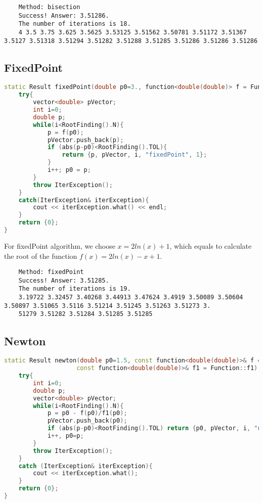 \documentclass{article}
\begin{document}
\begin{lstlisting}
    Method: bisection
    Success! Answer: 3.51286.
    The number of iterations is 18.
    4 3.5 3.75 3.625 3.5625 3.53125 3.51562 3.50781 3.51172 3.51367 3.5127 3.51318 3.51294 3.51282 3.51288 3.51285 3.51286 3.51286 3.51286
\end{lstlisting}



\subsection{FixedPoint}

\begin{lstlisting}[language=c++]
static Result fixedPoint(double p0=3., function<double(double)> f = Function::f){
    try{
        vector<double> pVector;
        int i=0;
        double p;
        while(i<RootFinding().N){
            p = f(p0);
            pVector.push_back(p);
            if (abs(p-p0)<RootFinding().TOL){
                return {p, pVector, i, "fixedPoint", 1};
            }
            i++; p0 = p;
        }
        throw IterException();
    }
    catch(IterException& iterException){
        cout << iterException.what() << endl;
    }
    return {0};
}
\end{lstlisting}

For fixedPoint algorithm, we choose  $x=2ln(x)+1$, which equals to calculate the root of the function $f(x)=2ln(x)-x+1$.


\begin{lstlisting}
    Method: fixedPoint
    Success! Answer: 3.51285.
    The number of iterations is 19.
    3.19722 3.32457 3.40268 3.44913 3.47624 3.4919 3.50089 3.50604 3.50897 3.51065 3.5116 3.51214 3.51245 3.51263 3.51273 3.
    51279 3.51282 3.51284 3.51285 3.51285
\end{lstlisting}

\subsection{Newton}

\begin{lstlisting}[language=c++]
static Result newton(double p0=1.5, const function<double(double)>& f = Function::f,
                    const function<double(double)>& f1 = Function::f1) {
    try{
        int i=0;
        double p;
        vector<double> pVector;
        while(i<RootFinding().N){
            p = p0 - f(p0)/f1(p0);
            pVector.push_back(p0);
            if (abs(p-p0)<RootFinding().TOL) return {p0, pVector, i, "newton"};
            i++, p0=p;
        }
        throw IterException();
    }
    catch (IterException& iterException){
        cout << iterException.what();
    }
    return {0};
}
\end{lstlisting}
\end{document}
